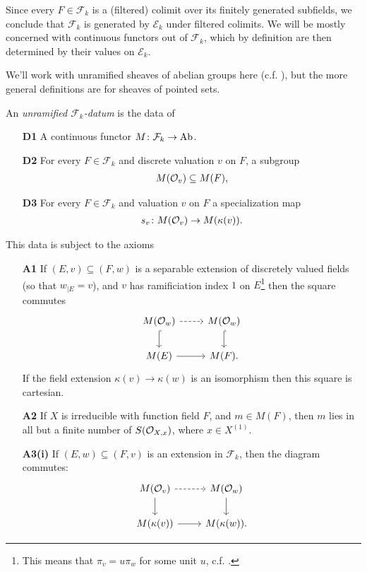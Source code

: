 \documentclass[11pt,openany]{book}
\begin{document}
\begin{remark} Since every $F \in \mathcal{F}_k$ is a (filtered) colimit over its finitely generated subfields, we conclude that $\mathcal{F}_k$ is generated by $\mathcal{E}_k$ under filtered colimits. We will be mostly concerned with continuous functors out of $\mathcal{F}_k$, which by definition are then determined by their values on $\mathcal{E}_k$.
\end{remark}


We'll work with unramified sheaves of abelian groups here (c.f. \cite[\S1.5]{Feld-thesis}), but the more general definitions are for sheaves of pointed sets.

\begin{definition} \cite[2.6,2.9]{Morel}
An \textit{unramified $\mathcal{F}_k$-datum} is the data of
\begin{enumerate}
    \item[\textbf{D1}] A continuous functor $M \colon \mathcal{F}_k \to \mathrm{Ab}$.
    \item[\textbf{D2}] For every $F\in \mathcal{F}_k$ and discrete valuation $v$ on $F$, a subgroup
    \begin{align*}
        M(\mathcal{O}_v) \subseteq M(F),
    \end{align*}
    \item[\textbf{D3}] For every $F\in \mathcal{F}_k$ and valuation $v$ on $F$ a specialization map
    \begin{align*}
        s_v \colon M(\mathcal{O}_v) \to M(\kappa(v)).
    \end{align*}
\end{enumerate}
This data is subject to the axioms
\begin{enumerate}
    \item[\textbf{A1}] If $(E,v) \subseteq (F,w)$ is a separable extension of discretely valued fields (so that $w_{|E} = v$), and $v$ has ramificiation index $1$ on $E$\footnote{%
    This means that $\pi_v = u\pi_w$ for some unit $u$, c.f. \cite[09E4]{Stacks}.
    }
    then the square commutes
\[ \begin{tikzcd}
    M(\O_w)\dar[hook]\rar[dashed] & M(\O_w)\dar[hook]\\
    M(E)\rar & M(F).
\end{tikzcd} \]
If the field extension $\kappa(v) \to \kappa(w)$ is an isomorphism then this square is cartesian.

    \item[\textbf{A2}] If $X$ is irreducible with function field $F$, and $m\in M(F)$, then $m$ lies in all but a finite number of $S(\mathcal{O}_{X,x})$, where $x\in X^{(1)}$.
    \item[\textbf{A3(i)}] If $(E,w) \subseteq (F,v)$ is an extension in $\mathcal{F}_k$, then the diagram commutes:
\[ \begin{tikzcd}
    M(\mathcal{O}_v)\dar\rar[dashed] & M(\O_w)\dar\\
    M(\kappa(v))\rar & M(\kappa(w)).
\end{tikzcd} \]
    

\end{enumerate}
\end{definition}
\end{document}

